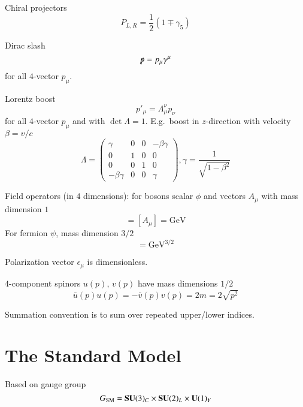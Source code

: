 Chiral projectors
\begin{equation}
   P_{L, R} = \frac{1}{2} (1 \mp \gamma_5) \label{0.6}
\end{equation}

Dirac slash
\begin{equation}
   \slashed{p} = p_\mu \gamma^\mu
   \label{0.7}
\end{equation}
for all $4$-vector $p_\mu$.

Lorentz boost
\begin{equation}
   p'_\mu = \Lambda_\mu^\nu p_\nu
   \label{0.8}
\end{equation}
for all $4$-vector $p_\mu$ and with $\det \Lambda = 1$. E.g.~boost in $z$-direction with velocity $\beta = v/c$
\begin{equation}
   \Lambda = \begin{pmatrix} \gamma & 0 & 0 & -\beta\gamma \\ 0 & 1 & 0 & 0 \\ 0 & 0 & 1 & 0 \\ -\beta \gamma & 0 & 0 & \gamma \end{pmatrix}, \gamma = \frac{1}{\sqrt{1-\beta^2}}
   \label{0.9}
\end{equation}

Field operators (in $4$ dimensions): for bosons scalar $\phi$ and vectors $A_\mu$ with mass dimension $1$
\begin{equation*}
   [\phi] = [A_\mu] = \si{\giga\eV} 
\end{equation*}
For fermion $\psi$, mass dimension $3/2$
\begin{equation*}
   [\psi] = \si{\giga\eV}^{3/2}
\end{equation*}

Polarization vector $\epsilon_\mu$ is dimensionless.

$4$-component spinors $u(p)$, $v(p)$ have mass dimensions $1/2$
\begin{equation}
   \bar u (p) u (p) = - \bar v (p) v(p) = 2m = 2 \sqrt{p^2} \label{0.11}
\end{equation}

Summation convention is to sum over repeated upper/lower indices.

\section{The Standard Model}
Based on gauge group
\begin{equation}
   G_\text{SM} = \mathbf{SU}(3)_C \times \mathbf{SU}(2)_L \times \mathbf{U}(1)_Y
   \label{0.12}
\end{equation}

